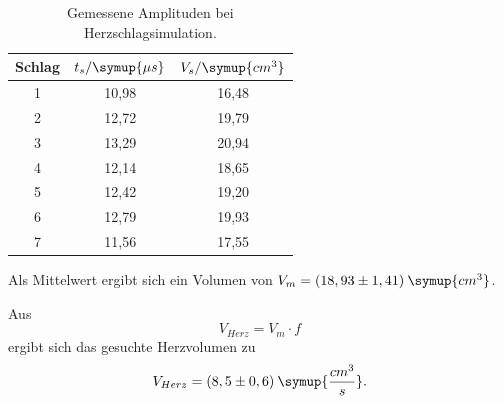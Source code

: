 \begin{table}[H]
  \centering
  \caption{Gemessene Amplituden bei Herzschlagsimulation.}
  \label{tab:1}
  \begin{tabular}{c c c }
    \toprule
  Schlag & $t_s/\symup{\mu s}$ & $V_s/\symup{cm^3}$ \\
    \midrule
    1  &  10,98 & 16,48     \\
    2  &  12,72 & 19,79     \\
    3  &  13,29 & 20,94     \\
    4  &  12,14 & 18,65     \\
    5  &  12,42 & 19,20     \\
    6  &  12,79 & 19,93     \\
    7  &  11,56 & 17,55     \\
    \bottomrule
  \end{tabular}
\end{table}

\noindent Als Mittelwert ergibt sich ein Volumen von $V_{m} = (18,93 \pm 1,41) \: \symup{cm^3}$.

\noindent Aus
\begin{equation*}
  V_{Herz} = V_m \cdot f
\end{equation*}
ergibt sich das gesuchte Herzvolumen zu
\begin{equation*}
  V_{Herz} = (8,5 \pm 0,6) \: \symup{\frac{cm^3}{s}}.
\end{equation*}

